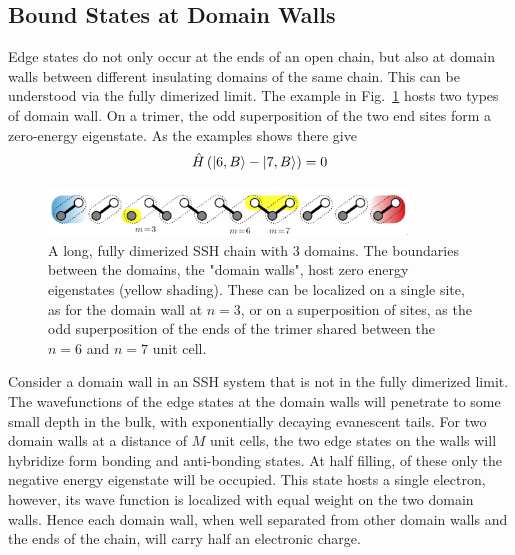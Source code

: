 \subsection{Bound States at Domain Walls}\label{sec:1.5.5}
Edge states do not only occur at the ends of an open chain, but also at domain walls between different insulating domains of the same chain.
This can be understood via the fully dimerized limit.
The example in Fig.~\ref{fig:1.8} hosts two types of domain wall.
On a trimer, the odd superposition of the two end sites form a zero-energy eigenstate.
As the examples shows there give
\begin{equation}\label{eq:1.41}
    \hat{H} \left( \ket{6,B} - \ket{7,B} \right) = 0
\end{equation}
%
\begin{figure}
    \center
    \includegraphics[width=0.85\textwidth]{fig/fig1-8.png}
    \caption{A long, fully dimerized SSH chain with 3 domains. The boundaries between the domains, the "domain walls", host zero energy eigenstates (yellow shading). These can be localized on a single site, as for the domain wall at $n=3$, or on a superposition of sites, as the odd superposition of the ends of the trimer shared between the $n=6$ and $n=7$ unit cell.}
    \label{fig:1.8}
\end{figure}

Consider a domain wall in an SSH system that is not in the fully dimerized limit.
The wavefunctions of the edge states at the domain walls will penetrate to some small depth in the bulk, with exponentially decaying evanescent tails.
For two domain walls at a distance of $M$ unit cells, the two edge states on the walls will hybridize form bonding and anti-bonding states.
At half filling, of these only the negative energy eigenstate will be occupied.
This state hosts a single electron, however, its wave function is localized with equal weight on the two domain walls.
Hence each domain wall, when well separated from other domain walls and the ends of the chain, will carry half an electronic charge.

